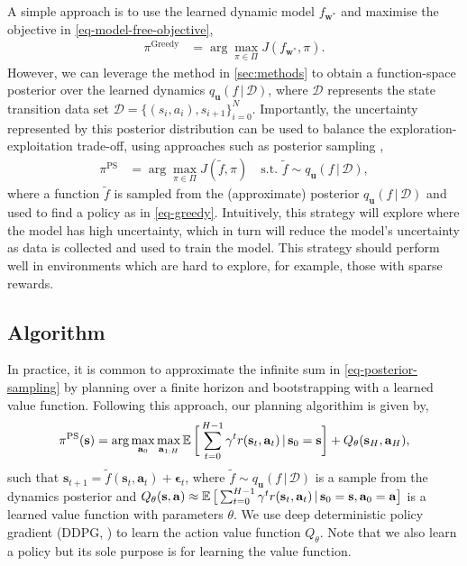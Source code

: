 \documentclass{article}
\newcommand{\state}{\ensuremath{\mathbf{s}}}
\newcommand{\action}{\ensuremath{\mathbf{a}}}
\newcommand{\noise}{\ensuremath{\bm\epsilon}}
\newcommand{\dataset}{\ensuremath{\mathcal{D}}}
\newcommand{\Horizon}{\ensuremath{H}}
\newcommand{\transitionFn}{\ensuremath{f}}
\newcommand{\policy}{\ensuremath{\pi}}
\renewcommand{\mid}{\,|\,}
\begin{document}
A simple approach is to use the learned dynamic model $f_{\mathbf{w}^{*}}$ and maximise the objective in \cref{eq-model-free-objective},
\begin{align} \label{eq-greedy}
  \policy^{\text{Greedy}} &= \arg \max_{\pi \in \Pi} J(f_{\mathbf{w}^{*}}, \pi).
\end{align}
However, we can leverage the method in \cref{sec:methods} to obtain a function-space posterior over the learned dynamics $q_{\mathbf{u}}(\transitionFn \mid \dataset)$,
where $\mathcal{D}$ represents the state transition data set \(\mathcal{D} = \{(s_{i},a_{i}), s_{i+1}\}_{i=0}^{N}\).
Importantly, the uncertainty represented by this posterior distribution can be used to balance the exploration-exploitation trade-off,
using approaches such as posterior sampling \cite{osbandWhyPosteriorSampling2017,osbandMoreEfficientReinforcement2013},
\begin{align} \label{eq-posterior-sampling}
  \policy^{\text{PS}} &= \arg \max_{\pi \in \Pi} J(\tilde{f}, \pi)
\quad \text{s.t. } \tilde{\transitionFn} \sim q_{\mathbf{u}}({\transitionFn} \mid \dataset),
\end{align}
where a function $\tilde{\transitionFn}$ is sampled from the (approximate) posterior $q_{\mathbf{u}}({\transitionFn} \mid \dataset)$ and used to find a policy as
in \cref{eq-greedy}.
Intuitively, this strategy will explore where the model has high uncertainty, which in turn will reduce the model's uncertainty as data is collected and used to
train the model.
This strategy should perform well in environments which are hard to explore, for example, those
with sparse rewards.



\subsection{Algorithm}
In practice, it is common to approximate the infinite sum in \cref{eq-posterior-sampling}
by planning over a finite
horizon and bootstrapping with a learned value function.
Following this approach, our planning algorithim is given by,
\begin{equation} \label{eq-fast-update-mpc}
  \policy^{\text{PS}}(\state) = \arg \max_{\action_{0}} \max_{\action_{1:\Horizon}}
\E \bigg[ \sum_{t=0}^{H-1} \gamma^{t} r(\state_{t},\action_{t}) \mid \state_{0}=\state  \bigg] + Q_{\theta}(\state_{\Horizon}, \action_{H}),
\end{equation}
such that $\state_{t+1} = \tilde{\transitionFn}(\state_{t}, \action_{t}) + \noise_{t}$, 
where $\tilde{\transitionFn} \sim q_{\mathbf{u}}(\transitionFn \mid \dataset)$ is a sample from the dynamics posterior and
${Q_{\theta}(\state, \action) \approx \E \big[ \sum_{t=0}^{H-1} \gamma^{t} r(\state_{t},\action_{t}) \mid \state_{0}=\state, \action_{0}=\action  \big]}$
is a learned value function with parameters $\theta$.
We use deep deterministic policy gradient (DDPG, \cite{lillicrapContinuousControlDeep2016}) to learn the action value function $Q_{\theta}$.
Note that we also learn a policy but its sole purpose is for learning the value function.
\end{document}
